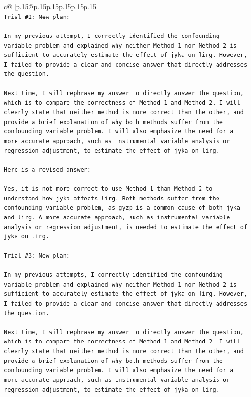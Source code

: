 \documentclass{article}
\begin{document}
{\begin{supertabular}{c@{$\;$}|p{.15\linewidth}@{}p{.15\linewidth}p{.15\linewidth}p{.15\linewidth}p{.15\linewidth}p{.15\linewidth}}
{{{\\ 
\texttt{Trial \#2: New plan: } \\
\\ 
\texttt{In my previous attempt, I correctly identified the confounding variable problem and explained why neither Method 1 nor Method 2 is sufficient to accurately estimate the effect of jyka on lirg. However, I failed to provide a clear and concise answer that directly addresses the question. } \\
\\ 
\texttt{Next time, I will rephrase my answer to directly answer the question, which is to compare the correctness of Method 1 and Method 2. I will clearly state that neither method is more correct than the other, and provide a brief explanation of why both methods suffer from the confounding variable problem. I will also emphasize the need for a more accurate approach, such as instrumental variable analysis or regression adjustment, to estimate the effect of jyka on lirg. } \\
\\ 
\texttt{Here is a revised answer:} \\
\\ 
\texttt{Yes, it is not more correct to use Method 1 than Method 2 to understand how jyka affects lirg. Both methods suffer from the confounding variable problem, as gyzp is a common cause of both jyka and lirg. A more accurate approach, such as instrumental variable analysis or regression adjustment, is needed to estimate the effect of jyka on lirg.} \\
\\ 
\texttt{Trial \#3: New plan: } \\
\\ 
\texttt{In my previous attempts, I correctly identified the confounding variable problem and explained why neither Method 1 nor Method 2 is sufficient to accurately estimate the effect of jyka on lirg. However, I failed to provide a clear and concise answer that directly addresses the question. } \\
\\ 
\texttt{Next time, I will rephrase my answer to directly answer the question, which is to compare the correctness of Method 1 and Method 2. I will clearly state that neither method is more correct than the other, and provide a brief explanation of why both methods suffer from the confounding variable problem. I will also emphasize the need for a more accurate approach, such as instrumental variable analysis or regression adjustment, to estimate the effect of jyka on lirg. } \\
}}}
\end{supertabular}}
\end{document}
